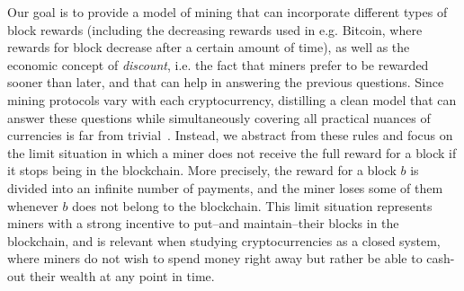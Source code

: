 \documentclass[a4paper,english,cleveref, autoref,numberwithinsect]{lipics-v2019}
\begin{document}
Our goal is to provide a model of mining that can incorporate different types of block rewards (including the decreasing rewards used in e.g. Bitcoin, where rewards for block decrease after a certain amount of time), as well as the economic concept of \emph{discount}, i.e. the fact that miners prefer to be rewarded sooner than later, and that can help in answering the previous questions. 
Since mining protocols vary with each cryptocurrency, 
distilling a clean model that can answer these questions while simultaneously covering 
all practical nuances of currencies is far from trivial~\cite{mininggames:2016}. 
Instead, we abstract from these rules and focus on the limit situation in which a miner does not receive the full reward for a block if it stops being in the blockchain. 
More precisely, the reward for a block $b$ is divided into an infinite number of payments, and the miner loses some of them whenever $b$ does not belong to the blockchain. 
This limit situation represents miners with a strong incentive to put--and maintain--their blocks in the blockchain, and is relevant when studying cryptocurrencies
as a closed system, where miners do 
not wish to spend money right away but rather be able to cash-out their wealth at any point in time. 
%
\end{document}
